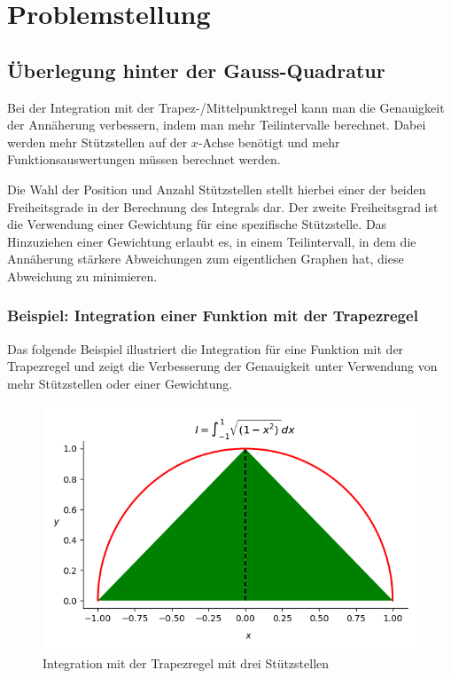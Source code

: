 %
%
%
\section{Problemstellung
\label{quadratur:section:problemstellung}}
\subsection{Überlegung hinter der Gauss-Quadratur \label{quadratur:subsection:ueberlegung}}

Bei der Integration mit der Trapez-/Mittelpunktregel kann man die Genauigkeit
der Annäherung verbessern, indem man mehr Teilintervalle berechnet.
Dabei werden mehr Stützstellen auf der $x$-Achse benötigt und mehr Funktionsauswertungen
müssen berechnet werden.

Die Wahl der Position und Anzahl Stützstellen stellt hierbei einer der beiden Freiheitsgrade
in der Berechnung des Integrals dar.
Der zweite Freiheitsgrad ist die Verwendung einer Gewichtung für eine spezifische Stützstelle.
Das Hinzuziehen einer Gewichtung erlaubt es, in einem Teilintervall, 
in dem die Annäherung stärkere Abweichungen zum eigentlichen Graphen hat, 
diese Abweichung zu minimieren. 


\subsubsection{Beispiel: Integration einer Funktion mit der Trapezregel}
Das folgende Beispiel illustriert die Integration für eine Funktion mit der Trapezregel und
zeigt die Verbesserung der Genauigkeit unter Verwendung von mehr Stützstellen oder einer Gewichtung.

\begin{figure}[!h]
    \centering
    \includegraphics[scale=0.7]{papers/quadratur/figures/GaussTrapez1}
    \caption{Integration mit der Trapezregel mit drei Stützstellen
    \label{quadratur:figure:trapez1}} 
\end{figure}


